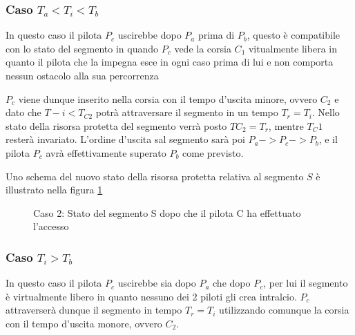 \documentclass[a4paper,11pt, twoside]{book}
\begin{document}
	\subsubsection{Caso $T_a < T_i < T_b$}
	  In questo caso il pilota $P_c$ uscirebbe dopo $P_a$  prima di $P_b$, questo è compatibile con 
	  lo stato del segmento in quando $P_c$ vede la corsia $C_1$ vitualmente libera in quanto
	  il pilota che la impegna esce in ogni caso prima di lui e non comporta nessun ostacolo alla sua percorrenza
	  
	  $P_c$ viene dunque inserito nella corsia con il tempo d'uscita minore, ovvero $C_2$ e dato che
	  $T-i < T_{C2}$ potrà attraversare il segmento in un tempo $T_r = T_i$. 
	  Nello stato della risorsa protetta del segmento verrà posto $TC_2 = T_r$, mentre $T_C1$ resterà invariato.
	  L'ordine d'uscita sal segmento sarà poi $P_a -> P_c -> P_b$, e il pilota $P_c$ avrà effettivamente 
	  superato $P_b$ come previsto.
	  
	  Uno schema del nuovo stato della risorsa protetta relativa al segmento $S$ è illustrato nella figura 
	  \ref{fgr:AccessoSegmentiCaso2}

	  \begin{figure}[h]
	    \centering
	    \caption{Caso 2: Stato del segmento S dopo che il pilota C ha effettuato l'accesso}
	    \label{fgr:AccessoSegmentiCaso2}
	  \end{figure}
	
	\subsubsection{Caso $T_i > T_b$}
	  In questo caso il pilota $P_c$ uscirebbe sia dopo $P_a$ che dopo $P_c$, per lui il segmento
	  è virtualmente libero in quanto nessuno dei 2 piloti gli crea intralcio. $P_c$ attraverserà
	  dunque il segmento in tempo $T_r = T_i$ utilizzando comunque la corsia con il tempo d'uscita monore,
	  ovvero $C_2$.
	  
\end{document}
